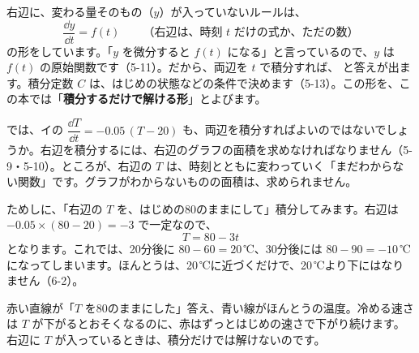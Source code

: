 

\leavevmode\label{bk:6-3:miwake}右辺に、変わる量そのもの（$y$）が入っていないルールは、
\[ \frac{\dd y}{\dd t}=f(t)\qquad\text{（右辺は、時刻 $t$ だけの式か、ただの数）} \]
の形をしています。「$y$ を微分すると $f(t)$ になる」と言っているので、$y$ は $f(t)$ の原始関数です（5-11）。だから、両辺を $t$ で積分すれば、
と答えが出ます。積分定数 $C$ は、はじめの状態などの条件で決めます（5-13）。この形を、この本では「\textbf{積分するだけで解ける形}」とよびます。

では、イの $\dfrac{\dd T}{\dd t}=-0.05\,(T-20)$ も、両辺を積分すればよいのではないでしょうか。右辺を積分するには、右辺のグラフの面積を求めなければなりません（5-9・5-10）。ところが、右辺の $T$ は、時刻とともに変わっていく「まだわからない関数」です。グラフがわからないものの面積は、求められません。

ためしに、「右辺の $T$ を、はじめの80のままにして」積分してみます。右辺は $-0.05\times(80-20)=-3$ で一定なので、
\[ T=80-3t \]
となります。これでは、20分後に $80-60=20$\,℃、30分後には $80-90=-10$\,℃になってしまいます。ほんとうは、20\,℃に近づくだけで、20\,℃より下にはなりません（6-2）。

\noindent\begin{minipage}[c]{0.52\linewidth}\centering
{}
\end{minipage}\hfill
\begin{minipage}[c]{0.45\linewidth}\raggedright
赤い直線が「$T$ を80のままにした」答え、青い線がほんとうの温度。冷める速さは $T$ が下がるとおそくなるのに、赤はずっとはじめの速さで下がり続けます。右辺に $T$ が入っているときは、積分だけでは解けないのです。
\end{minipage}

